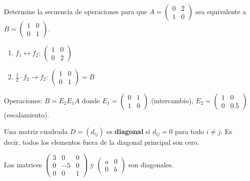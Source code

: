 \begin{example}\label{ex:equiv2}
Determine la secuencia de operaciones para que $A = \begin{pmatrix} 0 & 2 \\ 1 & 0 \end{pmatrix}$ sea equivalente a $B = \begin{pmatrix} 1 & 0 \\ 0 & 1 \end{pmatrix}.$
\begin{myproof}
\begin{enumerate}
\item $f_1 \leftrightarrow f_2$: $\begin{pmatrix} 1 & 0 \\ 0 & 2 \end{pmatrix}$
\item $\frac{1}{2} \cdot f_2 \to f_2$: $\begin{pmatrix} 1 & 0 \\ 0 & 1 \end{pmatrix} = B$
\end{enumerate}
Operaciones: $B = E_2 E_1 A$ donde $E_1 = \begin{pmatrix} 0 & 1 \\ 1 & 0 \end{pmatrix}$ (intercambio), $E_2 = \begin{pmatrix} 1 & 0 \\ 0 & 0.5 \end{pmatrix}$ (escalamiento).
\end{myproof}
\end{example}


\begin{definition}
Una matriz cuadrada $D = (d_{ij})$ es \textbf{diagonal} si $d_{ij} = 0$ para todo $i \neq j$. Es decir, todos los elementos fuera de la diagonal principal son cero.
\end{definition}

\begin{example} Las matrices 
$\begin{pmatrix}
3 & 0 & 0 \\
0 & -5 & 0 \\
0 & 0 & 1 
\end{pmatrix}$ y $\begin{pmatrix}
a & 0 \\
0 & b 
\end{pmatrix}$ son diagonales.
\end{example}

